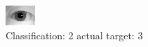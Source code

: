 \begin{figure}[h!]
\begin{center}
\includegraphics[width=0.60\columnwidth]{figures/ID1149_class_2_target_3.png}
\end{center}
\caption{ Classification: 2 actual target: 3}
\label{fig:ID1149_class_2_target_3}
\end{figure}
